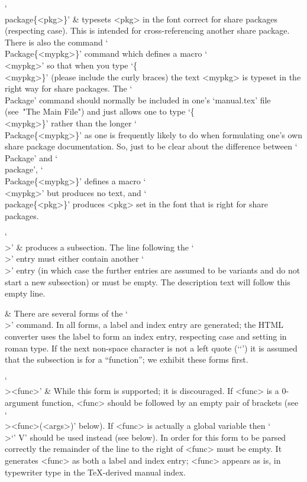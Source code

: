 `\\package\{<pkg>\}' &
    typesets <pkg> in the font correct  for  share  packages  (respecting
    case). This is intended for cross-referencing  another share package.
    There  is  also  the  command  `\\Package\{<mypkg>\}'  command  which
    defines a macro `\\<mypkg>' so that  when  you  type  `\{\\<mypkg>\}'
    (please include the curly braces) the text <mypkg> is typeset in  the
    right way for share packages. The `\\Package' command should normally
    be included in one's `manual.tex' file (see~"The Main File") and just
    allows  one  to  type  `\{\\<mypkg>\}'   rather   than   the   longer
    `\\Package\{<mypkg>\}'  as  one  is  frequently  likely  to  do  when
    formulating one's own share package documentation.  So,  just  to  be
    clear about  the  difference  between  `\\Package'  and  `\\package',
    `\\Package\{<mypkg>\}' defines a macro `\\<mypkg>'  but  produces  no
    text, and `\\package\{<pkg>\}' produces <pkg> set in the font that is
    right for share packages.

`\\>' &
    produces a subsection. 
    The line following the `\\>' entry must either contain another `\\>'
    entry (in which case the further entries are assumed to be variants
    and do not start a new subsection) or must be empty.
    The description text will follow this empty line.

  & There are several forms of the `\\>' command.
    In all forms, a label and index entry are generated; the HTML 
    converter uses the label to form an index entry, respecting case
    and setting in roman type.
    If the next non-space character is not a left quote (`\lq') it is 
    assumed that the subsection is for a ``function''; we exhibit 
    these forms first. 

`\\><func>' &
    While this form is supported; it  is  discouraged.  If  <func>  is  a
    0-argument function, <func> should be followed by an  empty  pair  of
    brackets (see `\\><func>(<args>)' below). If  <func>  is  actually  a
    global variable  then  `\\>\lq<global-var>{\rq}  V'  should  be  used
    instead (see below). In order for this form to  be  parsed  correctly
    the remainder of the line to the right of <func> must  be  empty.  It
    generates <func> as both a label and index entry; <func>  appears  as
    is, in typewriter type in the {\TeX}-derived manual index.

